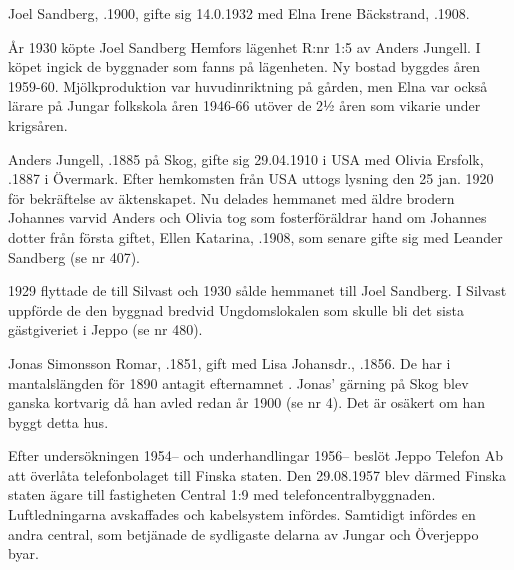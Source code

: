 

Joel Sandberg, .1900, gifte sig 14.0.1932 med Elna Irene Bäckstrand, .1908.

År 1930 köpte Joel Sandberg Hemfors lägenhet R:nr 1:5 av Anders Jungell. I köpet ingick de byggnader som fanns på lägenheten. Ny bostad byggdes åren 1959-60. Mjölkproduktion var huvudinriktning på gården, men Elna var också lärare på Jungar folkskola åren 1946-66 utöver de 2½ åren som vikarie under krigsåren.
\begin{jhchildren}
  \item {}
  \item {}
  \item {}
  \item {}
\end{jhchildren}


Anders Jungell, .1885 på Skog, gifte sig  29.04.1910 i USA med Olivia Ersfolk, .1887 i Övermark. Efter hemkomsten från USA uttogs lysning den 25 jan. 1920 för bekräftelse av äktenskapet. Nu delades hemmanet med äldre brodern Johannes varvid Anders och Olivia tog som fosterföräldrar hand om Johannes dotter från första giftet, Ellen Katarina, .1908, som senare gifte sig med Leander Sandberg (se nr 407).

1929 flyttade de till Silvast och 1930 sålde hemmanet till Joel Sandberg. I Silvast uppförde de den byggnad bredvid Ungdomslokalen som skulle bli det sista gästgiveriet i Jeppo (se nr 480).


Jonas Simonsson Romar, .1851, gift med Lisa Johansdr., .1856. De har i mantalslängden för 1890 antagit efternamnet . Jonas' gärning på Skog blev ganska kortvarig  då han avled redan år 1900 (se nr 4). Det är osäkert om han byggt detta hus.






Efter undersökningen 1954-- och underhandlingar 1956-- beslöt	Jeppo Telefon Ab att överlåta telefonbolaget till Finska staten. Den 29.08.1957 blev därmed Finska staten ägare till fastigheten Central 1:9 med	telefoncentralbyggnaden. Luftledningarna avskaffades och kabelsystem infördes. Samtidigt infördes en andra central, som betjänade de sydligaste delarna av Jungar och Överjeppo byar.

